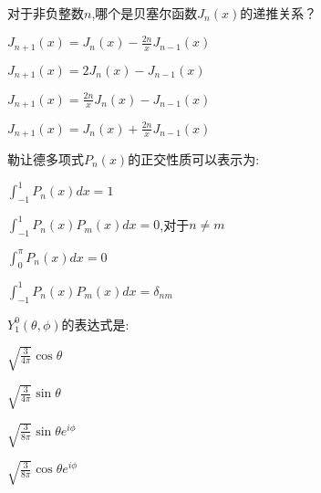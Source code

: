 \documentclass{njustexam}
\begin{document}







\begin{problem}
  对于非负整数$n$,哪个是贝塞尔函数$J_n(x)$的递推关系？
  \begin{abcd}
    \item  $J_{n+1}(x) = J_n(x) - \frac{2n}{x} J_{n-1}(x)$
    \item  $J_{n+1}(x) = 2 J_n(x) - J_{n-1}(x)$
    \item  $J_{n+1}(x) = \frac{2n}{x} J_n(x) - J_{n-1}(x)$
    \item  $J_{n+1}(x) = J_n(x) + \frac{2n}{x} J_{n-1}(x)$
  \end{abcd}
\end{problem}

\begin{problem}
  勒让德多项式$P_n(x)$的正交性质可以表示为:
  \begin{abcd}
    \item $\int_{-1}^{1} P_n(x) dx = 1$

    \item $\int_{-1}^{1} P_n(x) P_m(x) dx = 0$,对于$n \neq m$
    
    \item $\int_{0}^{\pi} P_n(x) dx = 0$
    
    \item $\int_{-1}^{1} P_n(x) P_m(x) dx = \delta_{nm}$
  \end{abcd}
\end{problem}

\begin{problem}
  $Y_{1}^{0}(\theta, \phi)$的表达式是:
\begin{abcd}
  \item $\sqrt{\frac{3}{4\pi}} \cos \theta$
  \item $\sqrt{\frac{3}{4\pi}} \sin \theta$
  \item $\sqrt{\frac{3}{8\pi}} \sin \theta e^{i\phi}$
  \item $\sqrt{\frac{3}{8\pi}} \cos \theta e^{i\phi}$
\end{abcd}
\end{problem}
\end{document}
